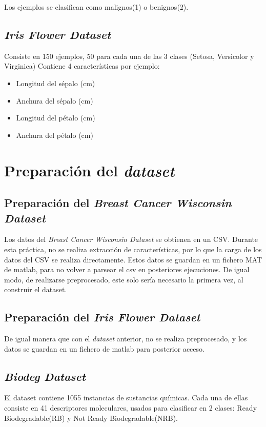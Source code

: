 \documentclass[a4paper,openwrite,12pt]{article}
\begin{document}
Los ejemplos se clasifican como malignos(1) o benignos(2).

\subsection{\textit{Iris Flower Dataset}}
Consiste en 150 ejemplos, 50 para cada una de las 3 clases (Setosa, Versicolor y Virginica)
Contiene 4 características por ejemplo:
\begin{itemize}
    \item Longitud del sépalo (cm)
    \item Anchura del sépalo (cm)
    \item Longitud del pétalo (cm)
    \item Anchura del pétalo (cm)
\end{itemize}

\section{Preparación del \textit{dataset}}
\subsection{Preparación del \textit{Breast Cancer Wisconsin Dataset}}
Los datos del \textit{Breast Cancer Wisconsin Dataset} se obtienen en un CSV.
Durante esta práctica, no se realiza extracción de características, por lo que la carga de los datos del CSV se realiza directamente. Estos datos se guardan en un fichero MAT de matlab, para no volver a parsear el csv en posteriores ejecuciones. De igual modo, de realizarse preprocesado, este solo sería necesario la primera vez, al construir el dataset.

\subsection{Preparación del \textit{Iris Flower Dataset}}
De igual manera que con el \textit{dataset} anterior, no se realiza preprocesado, y los datos se guardan en un fichero de matlab para posterior acceso.

\subsection{\textit{Biodeg Dataset}}
El dataset contiene 1055 instancias de sustancias químicas.
Cada una de ellas consiste en 41 descriptores moleculares, usados para clasificar en 2 clases: Ready Biodegradable(RB) y Not Ready Biodegradable(NRB).
\end{document}
